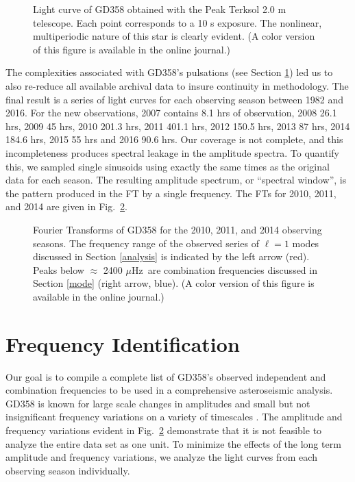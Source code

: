 \documentclass[12pt,preprint]{aastex}
\newcommand{\muHz}{\mbox{$\mu$Hz}}
\begin{document}
\begin{figure}
\caption{Light curve of GD358 obtained with the Peak Terksol 2.0 m telescope.  Each point corresponds 
to a 10 s exposure. The nonlinear, multiperiodic nature of this star is clearly evident.
(A color version of this figure is available in the online journal.)
\label{tersk}
}
\end{figure}

The complexities associated with GD358's pulsations (see Section \ref{freq}) led us to also 
re-reduce all available archival data \citep{Provencal09, Bradley04, Kepler03, Winget94, Winget82} to
insure continuity in methodology. The final result is a series of light curves 
for each observing season between 1982 and 2016. 
For the new observations, 2007 contains 8.1 hrs of observation, 2008 26.1 hrs, 2009 45 hrs, 
2010 201.3 hrs, 2011 401.1 hrs, 2012 150.5 hrs, 2013 87 hrs, 2014 184.6 hrs, 2015 55 hrs and 2016 90.6 hrs. 
Our coverage is not complete, and this incompleteness produces spectral leakage in the 
amplitude spectra. To quantify this, we sampled single sinusoids using exactly the 
same times as the original data for each season. The resulting amplitude spectrum, 
or ``spectral window'', is the pattern produced in the FT by a single frequency. 
The FTs for 2010, 2011, and 2014 are given in Fig.~\ref{fts}.


\begin{figure}
\caption{Fourier Transforms of GD358 for the 2010, 2011, and 2014 observing seasons.
The frequency range of the observed series of $\ell=1$ modes discussed in Section \ref{analysis} 
is indicated by the left arrow (red).  Peaks below $\approx$ 2400 \muHz\ are combination 
frequencies discussed in Section \ref{mode} (right arrow, blue). 
(A color version of this figure is available in the online journal.)
\label{fts}
}
\end{figure}

\section{Frequency Identification}\label{freq}
 
Our goal is to compile a complete list of GD358's observed independent and combination frequencies 
to be used in a comprehensive asteroseismic analysis. GD358 is known for large scale changes in 
amplitudes and small but not insignificant frequency variations on a variety of timescales 
\citep{Provencal09, Kepler03}.  The amplitude and frequency variations evident in Fig.~\ref{fts} demonstrate that 
it is not feasible to analyze the entire data set as one unit. To minimize the effects of the long term  
amplitude and frequency variations, we analyze the light curves from each observing season individually.
\end{document}
